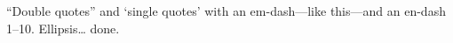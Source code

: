 \documentclass{article}
\begin{document}
``Double quotes'' and `single quotes' with an em-dash---like this---and an
en-dash 1--10. Ellipsis\ldots{} done.
\end{document}

